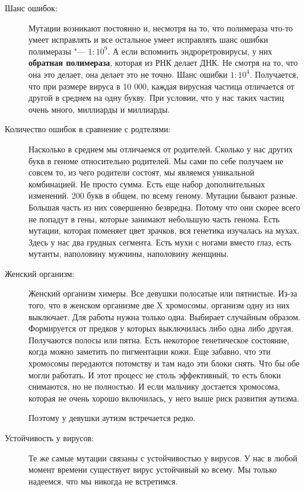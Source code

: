 \begin{description}
\item[Шанс ошибок:]
Мутации возникают постоянно и, несмотря на то, что 
полимераза что-то умеет исправлять и все остальное умеет исправлять
шанс ошибки полимеразы "--- $1:10^9$. А если вспомнить 
эндроретровирусы, у них \textbf{обратная полимераза}, 
которая из РНК делает ДНК. Не смотря на то, что она 
это делает, она делает это не точно. Шанс ошибки $1:10^4$. 
Получается, что при размере вируса в 10 000, каждая вирусная 
частица отличается от другой в среднем на одну букву. При 
условии, что у нас таких частиц очень много, миллиарды и миллиарды. 

\item[Количество ошибок в сравнение с родтелями:]
Насколько в среднем мы отличаемся от родителей. Сколько у
нас других букв в геноме относительно родителей. Мы сами по себе 
получаем не совсем то, из чего родители состоят, мы являемся уникальной комбинацией. 
Не просто сумма. Есть еще набор дополнительных изменений. 200 букв в общем, 
по всему геному. Мутации бывают разные. 
Большая часть из них совершенно безвредна. Потому что они скорее всего 
не попадут в гены, которые занимают небольшую часть генома. Есть мутации, 
которая поменяет цвет зрачков, вся генетика изучалась на мухах. Здесь 
у нас два грудных сегмента. Есть мухи с ногами вместо глаз, 
есть мутанты, наполовину мужчины, наполовину женщины. 

\item[Женский организм:]
Женский организм химеры. Все девушки полосатые или пятнистые. Из-за того, 
что в женском организме две X хромосомы, организм одну из них выключает. Для 
работы нужна только одна. Выбирает случайным образом. Формируется от предков у которых 
выключилась либо одна либо другая. Получаются полосы или пятна. 
Есть некоторое генетическое состояние, когда можно заметить по пигментации кожи. 
Еще забавно, что эти хромосомы передаются потомству и там 
надо эти блоки снять. Что бы обе могли работать. И этот 
процесс не столь эффективный, то есть блоки снимаются, но не полностью. 
И если мальчику достается хромосома, которая не очень хорошо включилась, 
у него выше риск развития аутизма. 

Поэтому у девушки аутизм встречается редко. 

\item[Устойчивость у вирусов:]
Те же самые мутации связаны с устойчивостью у вирусов. У нас в любой момент 
времени существует вирус устойчивый ко всему. Мы только надеемся, что мы никогда не встретимся.

\end{description}

